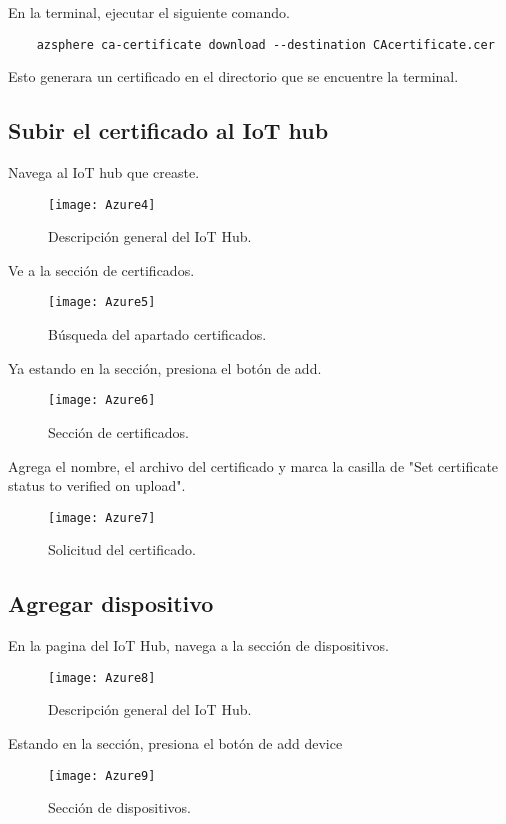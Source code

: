 En la terminal, ejecutar el siguiente comando.
\begin{verbatim}
	azsphere ca-certificate download --destination CAcertificate.cer
\end{verbatim}
Esto generara un certificado en el directorio que se encuentre la terminal.
\pagebreak
\subsection{Subir el certificado al IoT hub}
Navega al IoT hub que creaste.
\begin{figure}[h]
	\centering
	\texttt{[image: Azure4]}
	\caption{Descripción general del IoT Hub.}
\end{figure}

Ve a la sección de certificados.
\begin{figure}[h]
	\centering
	\texttt{[image: Azure5]}
	\caption{Búsqueda del apartado certificados.}
\end{figure}

\pagebreak
Ya estando en la sección, presiona el botón de add.
\begin{figure}[h]
	\centering
	\texttt{[image: Azure6]}
	\caption{Sección de certificados.}
\end{figure}

Agrega el nombre, el archivo del certificado y marca la casilla de "Set certificate status to verified on upload".
\begin{figure}[h]
	\centering
	\texttt{[image: Azure7]}
	\caption{Solicitud del certificado.}
\end{figure}
\pagebreak
\subsection{Agregar dispositivo}
En la pagina del IoT Hub, navega a la sección de dispositivos.
\begin{figure}[h]
	\centering
	\texttt{[image: Azure8]}
	\caption{Descripción general del IoT Hub.}
\end{figure}

Estando en la sección, presiona el botón de add device
\begin{figure}[h]
	\centering
	\texttt{[image: Azure9]}
	\caption{Sección de dispositivos.}
\end{figure}

